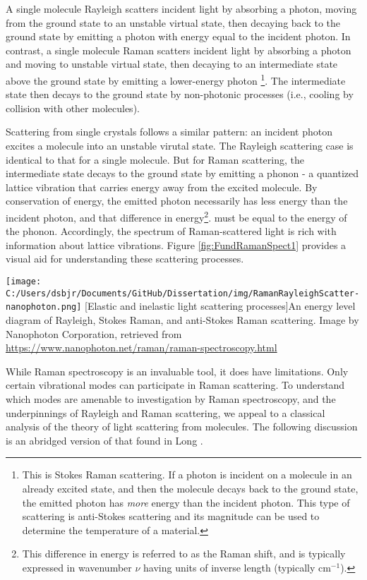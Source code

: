 A single molecule Rayleigh scatters incident light by absorbing a photon, moving from the ground state to an unstable virtual state, then decaying back to the ground state by emitting a photon with energy equal to the incident photon. In contrast, a single molecule Raman scatters incident light by absorbing a photon and moving to unstable virtual state, then decaying to an intermediate state above the ground state by emitting a lower-energy photon \footnote{This is Stokes Raman scattering. If a photon is incident on a molecule in an already excited state, and then the molecule decays back to the ground state, the emitted photon has \textit{more} energy than the incident photon. This type of scattering is anti-Stokes scattering and its magnitude can be used to determine the temperature of a material.}. The intermediate state then decays to the ground state by non-photonic processes (i.e., cooling by collision with other molecules).

Scattering from single crystals follows a similar pattern: an incident photon excites a molecule into an unstable virutal state. The Rayleigh scattering case is identical to that for a single molecule. But for Raman scattering, the intermediate state decays to the ground state by emitting a phonon - a quantized lattice vibration that carries energy away from the excited molecule. By conservation of energy, the emitted photon necessarily has less energy than the incident photon, and that difference in energy\footnote{This difference in energy is referred to as the Raman shift, and is typically expressed in wavenumber $\nu$ having units of inverse length (typically cm$^{-1}$).}. must be equal to the energy of the phonon. Accordingly, the spectrum of Raman-scattered light is rich with information about lattice vibrations. Figure \ref{fig:FundRamanSpect1} provides a visual aid for understanding these scattering processes.

\begin{centering}
\texttt{[image: C:/Users/dsbjr/Documents/GitHub/Dissertation/img/RamanRayleighScatter-nanophoton.png]}
  \captionsetup{width=0.75\textwidth}
  [Elastic and inelastic light scattering processes]{An energy level diagram of Rayleigh, Stokes Raman, and anti-Stokes Raman scattering. Image by Nanophoton Corporation, retrieved from \url{https://www.nanophoton.net/raman/raman-spectroscopy.html}}
  \label{fig:FundRamanSpect1}
\end{centering}

While Raman spectroscopy is an invaluable tool, it does have limitations. Only certain vibrational modes can participate in Raman scattering. To understand which modes are amenable to investigation by Raman spectroscopy, and the underpinnings of Rayleigh and Raman scattering, we appeal to a classical analysis of the theory of light scattering from molecules. The following discussion is an abridged version of that found in Long \cite{Long2002}.

